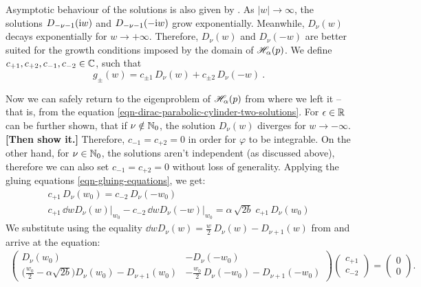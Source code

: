 Asymptotic behaviour of the solutions is also given by \cite{GradshteynRyzhik}. As $|w|\to\infty$, the solutions $D_{-\nu-1}(\mathrm{i} w)$ and $D_{-\nu-1}(-\mathrm{i} w)$ grow exponentially. Meanwhile, $D_\nu(w)$ decays exponentially for $w \to +\infty$. Therefore, $D_\nu(w)$ and $D_\nu(-w)$ are better suited for the growth conditions imposed by the domain of $\mathscr{H}_\alpha(p)$. We define $c_{+1}, c_{+2}, c_{-1}, c_{-2} \in \mathbb{C}$, such that
\begin{equation}
    g_\pm(w) = c_{\pm 1} \, D_\nu(w) + c_{\pm 2} \, D_\nu(-w) \: .
    \label{eqn-dirac-parabolic-cylinder-two-solutions}
\end{equation}

Now we can safely return to the eigenproblem of $\mathscr{H}_\alpha(p)$ from where we left it – that is, from the equation \eqref{eqn-dirac-parabolic-cylinder-two-solutions}. For $\epsilon\in\mathbb{R}$ can be further shown, that if $\nu \notin \mathbb{N}_0$, the solution $D_\nu(w)$ diverges for $w \to -\infty$. \textbf{[Then show it.]} Therefore, $c_{-1} = c_{+2} = 0$ in order for $\varphi$ to be integrable. On the other hand, for $\nu \in \mathbb{N}_0$, the solutions aren't independent (as discussed above), therefore we can also set $c_{-1} = c_{+2} = 0$ without loss of generality. Applying the gluing equations \eqref{eqn-gluing-equations}, we get:
\begin{gather*}
    c_{+1} \, D_\nu(w_0) = c_{-2} \, D_\nu(-w_0) \\[5pt]
    c_{+1} \, \dd{}{w} D_\nu(w) \big|_{w_0} - c_{-2} \, \dd{}{w} D_\nu(-w) \big|_{w_0} = \alpha \, \sqrt{2b} \; c_{+1} \, D_\nu(w_0)
\end{gather*}
We substitute using the equality $\dd{}{w} D_\nu(w) = \frac{w}{2} \, D_\nu(w) - D_{\nu+1}(w)$ from \cite{GradshteynRyzhik} and arrive at the equation:
\begin{align*}
    \begin{pmatrix}
        D_\nu(w_0) & -D_\nu(-w_0) \\[5pt]
        \big( \frac{w_0}{2} \!-\! \alpha \sqrt{2b} \big)
        D_\nu(w_0) \!-\! D_{\nu+1}(w_0) &
        -\frac{w_0}{2} \, D_\nu(-w_0) \!-\! D_{\nu+1}(-w_0)
    \end{pmatrix}
    \begin{pmatrix}
        c_{+1} \\[5pt] c_{-2}
    \end{pmatrix}
    =
    \begin{pmatrix}
        0 \\[5pt] 0
    \end{pmatrix}
    .
\end{align*}
